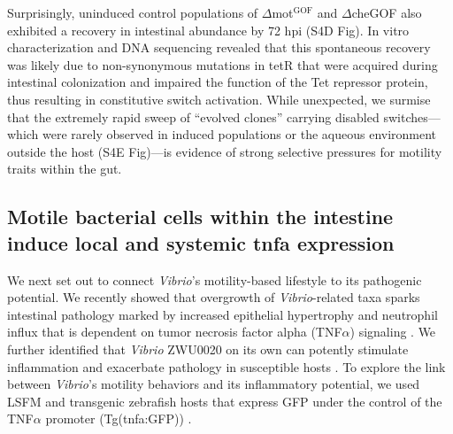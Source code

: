 {{{{{Surprisingly, uninduced control populations of $\Delta$mot$^{\text{GOF}}$ and $\Delta$cheGOF also exhibited a recovery in intestinal abundance by 72 hpi (S4D Fig). In vitro characterization and DNA sequencing revealed that this spontaneous recovery was likely due to non-synonymous mutations in tetR that were acquired during intestinal colonization and impaired the function of the Tet repressor protein, thus resulting in constitutive switch activation. While unexpected, we surmise that the extremely rapid sweep of ``evolved clones'' carrying disabled switches—which were rarely observed in induced populations or the aqueous environment outside the host (S4E Fig)—is evidence of strong selective pressures for motility traits within the gut. 


\subsection{Motile bacterial cells within the intestine induce local and systemic tnfa expression}
We next set out to connect \textit{Vibrio}'s motility-based lifestyle to its pathogenic potential. We recently showed that overgrowth of \textit{Vibrio}-related taxa sparks intestinal pathology marked by increased epithelial hypertrophy and neutrophil influx that is dependent on tumor necrosis factor alpha (TNF$\alpha$) signaling \cite{rolig_enteric_2017}. We further identified that \textit{Vibrio} ZWU0020 on its own can potently stimulate inflammation \cite{rolig_individual_2015} and exacerbate pathology in susceptible hosts \cite{rolig_enteric_2017}. To explore the link between \textit{Vibrio}'s motility behaviors and its inflammatory potential, we used LSFM and transgenic zebrafish hosts that express GFP under the control of the TNF$\alpha$ promoter (Tg(tnfa:GFP)) \cite{marjoram_epigenetic_2015}. 

}}}}}
